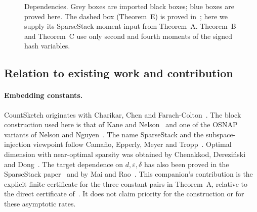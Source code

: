 \documentclass[11pt,a4paper]{article}
\theoremstyle{definition}
\theoremstyle{remark}
\newcommand{\E}{\mathbb E}
\newcommand{\tr}{\operatorname{tr}}
\newcommand{\eps}{\varepsilon}
\newcommand{\norm}[1]{\lVert#1\rVert}
\newcommand{\1}{\mathbf 1}
\begin{document}
\begin{figure}[ht]
\centering
{}
\caption{Dependencies. Grey boxes are imported black boxes; blue boxes
are proved here. The dashed box (Theorem~E) is proved in~\cite{RobustRP};
here we supply its SparseStack moment input from Theorem~A. Theorem~B
and Theorem~C use only second and fourth moments of the signed hash
variables.}
\label{fig:roadmap}
\end{figure}

\subsection{Relation to existing work and contribution}
\paragraph{Embedding constants.}
CountSketch originates with Charikar, Chen and
Farach-Colton~\cite{CharikarChenFarachColton2002}. The block construction
used here is that of Kane and Nelson~\cite{KaneNelson2014} and one of
the OSNAP variants of Nelson and Nguyen~\cite{NelsonNguyen2013}.
The name SparseStack and the subspace-injection viewpoint follow
Cama\~no, Epperly, Meyer and Tropp~\cite{CEMT}. Optimal dimension with
near-optimal sparsity was obtained by Chenakkod, Derezi\'nski and
Dong~\cite{CDD2025}. The target dependence on $d,\eps,\delta$ has also
been proved in the SparseStack paper~\cite{SSOriginal} and by Mai and
Rao~\cite{MaiRao2026}. This companion's contribution is the explicit
finite certificate for the three constant pairs in Theorem~A, relative
to the direct certificate of~\cite[Theorem~10.6]{SS}. It does not claim
priority for the construction or for these asymptotic rates.
\end{document}
